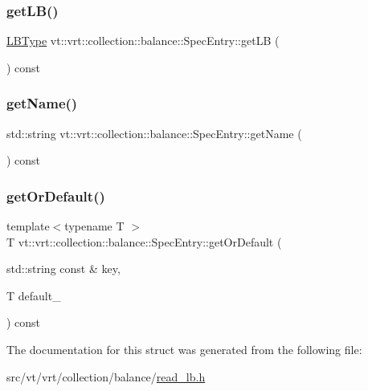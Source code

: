 \subsubsection{\texorpdfstring{get\+L\+B()}{getLB()}}
{\footnotesize\ttfamily \hyperlink{namespacevt_1_1vrt_1_1collection_1_1balance_ac4f99693509affcc67db182d4aad9b5c}{L\+B\+Type} vt\+::vrt\+::collection\+::balance\+::\+Spec\+Entry\+::get\+LB (\begin{DoxyParamCaption}{ }\end{DoxyParamCaption}) const\hspace{0.3cm}{\ttfamily [inline]}}

\mbox{\label{structvt_1_1vrt_1_1collection_1_1balance_1_1_spec_entry_a1a6b18669456c0d4c9c311c63fd912c8}} 
\subsubsection{\texorpdfstring{get\+Name()}{getName()}}
{\footnotesize\ttfamily std\+::string vt\+::vrt\+::collection\+::balance\+::\+Spec\+Entry\+::get\+Name (\begin{DoxyParamCaption}{ }\end{DoxyParamCaption}) const\hspace{0.3cm}{\ttfamily [inline]}}

\mbox{\label{structvt_1_1vrt_1_1collection_1_1balance_1_1_spec_entry_ae5c35506e15c2123029d071a284b9367}} 
\subsubsection{\texorpdfstring{get\+Or\+Default()}{getOrDefault()}}
{\footnotesize\ttfamily template$<$typename T $>$ \\
T vt\+::vrt\+::collection\+::balance\+::\+Spec\+Entry\+::get\+Or\+Default (\begin{DoxyParamCaption}\item[{std\+::string const \&}]{key,  }\item[{T}]{default\+\_\+ }\end{DoxyParamCaption}) const\hspace{0.3cm}{\ttfamily [inline]}}



The documentation for this struct was generated from the following file\+:\begin{DoxyCompactItemize}
\item 
src/vt/vrt/collection/balance/\hyperlink{read__lb_8h}{read\+\_\+lb.\+h}\end{DoxyCompactItemize}
